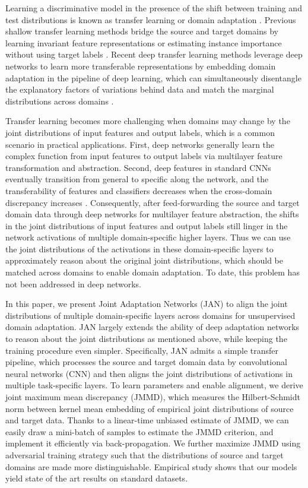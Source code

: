 \documentclass{article}
\begin{document}
Learning a discriminative model in the presence of the shift between training and test distributions is known as transfer learning or domain adaptation \cite{cite:TKDE10TLSurvey}. Previous shallow transfer learning methods bridge the source and target domains by learning invariant feature representations or estimating instance importance without using target labels \cite{cite:NIPS06KMM,cite:TNN11TCA,cite:ICML13Landmark}. Recent deep transfer learning methods leverage deep networks to learn more transferable representations by embedding domain adaptation in the pipeline of deep learning, which can simultaneously disentangle the explanatory factors of variations behind data and match the marginal distributions across domains \cite{cite:Arxiv14DDC,cite:ICCV15SDT,cite:ICML15DAN,cite:NIPS16RTN,cite:ICML15RevGrad,cite:NIPS16DSN}.

Transfer learning becomes more challenging when domains may change by the joint distributions of input features and output labels, which is a common scenario in practical applications. First, deep networks generally learn the complex function from input features to output labels via multilayer feature transformation and abstraction. Second, deep features in standard CNNs eventually transition from general to specific along the network, and the transferability of features and classifiers decreases when the cross-domain discrepancy increases \cite{cite:NIPS14CNN}. Consequently, after feed-forwarding the source and target domain data through deep networks for multilayer feature abstraction, the shifts in the joint distributions of input features and output labels still linger in the network activations of multiple domain-specific higher layers. Thus we can use the joint distributions of the activations in these domain-specific layers to approximately reason about the original joint distributions, which should be matched across domains to enable domain adaptation. To date, this problem has not been addressed in deep networks.

In this paper, we present Joint Adaptation Networks (JAN) to align the joint distributions of multiple domain-specific layers across domains for unsupervised domain adaptation. JAN largely extends the ability of deep adaptation networks \cite{cite:ICML15DAN} to reason about the joint distributions as mentioned above, while keeping the training procedure even simpler. Specifically, JAN admits a simple transfer pipeline, which processes the source and target domain data by convolutional neural networks (CNN) and then aligns the joint distributions of activations in multiple task-specific layers. To learn parameters and enable alignment, we derive joint maximum mean discrepancy (JMMD), which measures the Hilbert-Schmidt norm between kernel mean embedding of empirical joint distributions of source and target data. Thanks to a linear-time unbiased estimate of JMMD, we can easily draw a mini-batch of samples to estimate the JMMD criterion, and implement it efficiently via back-propagation. We further maximize JMMD using adversarial training strategy such that the distributions of source and target domains are made more distinguishable. Empirical study shows that our models yield state of the art results on standard datasets.
\end{document}

